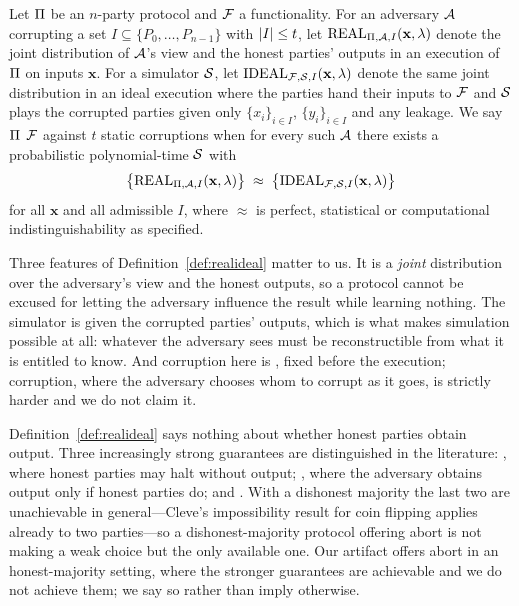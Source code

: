 \begin{definition}
\label{def:realideal}
Let $\Pi$ be an $n$-party protocol and $\mathcal{F}$ a functionality. For an adversary
$\mathcal{A}$ corrupting a set $I \subseteq \{P_0,\dots,P_{n-1}\}$ with $\left\lvert I \right\rvert \le t$,
let $\mathrm{REAL}_{\Pi,\mathcal{A},I}(\mathbf{x},\lambda)$ denote the joint distribution of
$\mathcal{A}$'s view and the honest parties' outputs in an execution of $\Pi$ on
inputs $\mathbf{x}$. For a simulator $\mathcal{S}$, let
$\mathrm{IDEAL}_{\mathcal{F},\mathcal{S},I}(\mathbf{x},\lambda)$ denote the same joint distribution in
an ideal execution where the parties hand their inputs to $\mathcal{F}$ and $\mathcal{S}$ plays
the corrupted parties given only $\{x_i\}_{i \in I}$, $\{y_i\}_{i\in I}$ and any
leakage. We say $\Pi$  $\mathcal{F}$ against $t$ static
corruptions when for every such $\mathcal{A}$ there exists a probabilistic
polynomial-time $\mathcal{S}$ with
\[
  \bigl\{\mathrm{REAL}_{\Pi,\mathcal{A},I}(\mathbf{x},\lambda)\bigr\}
  \;\approx\;
  \bigl\{\mathrm{IDEAL}_{\mathcal{F},\mathcal{S},I}(\mathbf{x},\lambda)\bigr\}
\]
for all $\mathbf{x}$ and all admissible $I$, where $\approx$ is perfect,
statistical or computational indistinguishability as specified.
\end{definition}

Three features of Definition~\ref{def:realideal} matter to us. It is a
\emph{joint} distribution over the adversary's view and the honest outputs, so a
protocol cannot be excused for letting the adversary influence the result while
learning nothing. The simulator is given the corrupted parties' outputs, which is
what makes simulation possible at all: whatever the adversary sees must be
reconstructible from what it is entitled to know. And corruption here is
, fixed before the execution;  corruption, where the
adversary chooses whom to corrupt as it goes, is strictly harder and we do not
claim it.

\begin{remark}
\label{rem:god}
Definition~\ref{def:realideal} says nothing about whether honest parties obtain
output. Three increasingly strong guarantees are distinguished in the literature:
, where honest parties may halt without output;
, where the adversary obtains output only if honest parties do; and
. With a dishonest majority the last two are
unachievable in general---Cleve's impossibility result for coin flipping applies
already to two parties---so a dishonest-majority protocol offering abort is not
making a weak choice but the only available one. Our artifact offers abort in an
honest-majority setting, where the stronger guarantees are achievable and we do
not achieve them; we say so rather than imply otherwise.
\end{remark}

